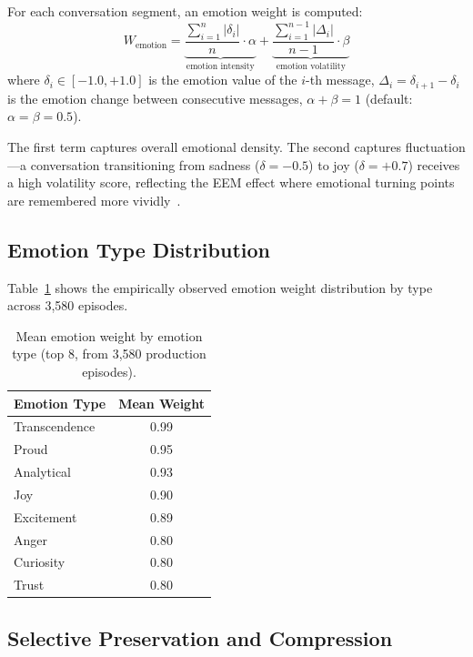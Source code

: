 \documentclass[11pt,a4paper]{article}
\begin{document}
For each conversation segment, an emotion weight is computed:
\begin{equation}
  W_{\text{emotion}}
  = \underbrace{\frac{\sum_{i=1}^{n} |\delta_i|}{n} \cdot \alpha}_{\text{emotion intensity}}
  + \underbrace{\frac{\sum_{i=1}^{n-1} |\Delta_i|}{n-1} \cdot \beta}_{\text{emotion volatility}}
  \label{eq:emotion_weight}
\end{equation}
where $\delta_i \in [-1.0, +1.0]$ is the emotion value of the $i$-th message,
$\Delta_i = \delta_{i+1} - \delta_i$ is the emotion change between consecutive messages,
$\alpha + \beta = 1$ (default: $\alpha = \beta = 0.5$).

The first term captures overall emotional density. The second captures fluctuation---a
conversation transitioning from sadness ($\delta = -0.5$) to joy ($\delta = +0.7$) receives
a high volatility score, reflecting the EEM effect where emotional turning points are
remembered more vividly~\citep{labar2006cognitive}.

\subsection{Emotion Type Distribution}

Table~\ref{tab:emotion_types} shows the empirically observed emotion weight distribution
by type across 3,580 episodes.

\begin{table}[h]
\centering
\caption{Mean emotion weight by emotion type (top 8, from 3,580 production episodes).}
\label{tab:emotion_types}
\small
\begin{tabular}{@{}lc@{}}
\toprule
\textbf{Emotion Type} & \textbf{Mean Weight} \\
\midrule
Transcendence & 0.99 \\
Proud         & 0.95 \\
Analytical    & 0.93 \\
Joy           & 0.90 \\
Excitement    & 0.89 \\
Anger         & 0.80 \\
Curiosity     & 0.80 \\
Trust         & 0.80 \\
\bottomrule
\end{tabular}
\end{table}

\subsection{Selective Preservation and Compression}
\end{document}

